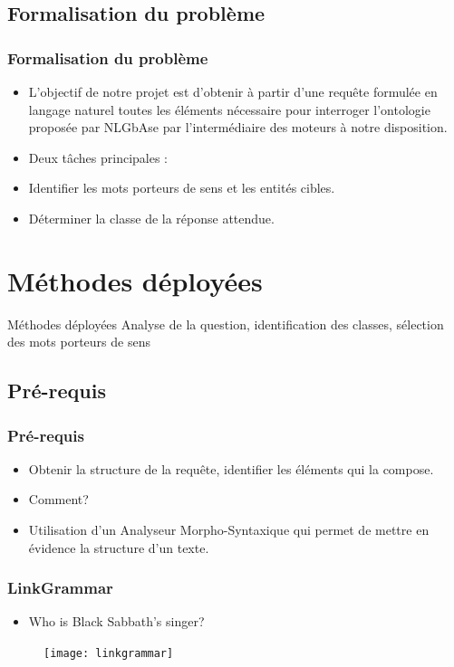 \documentclass[xcolor=dvipsnames]{beamer}
\begin{document}
\subsection{Formalisation du problème}
\frame 
{
    \frametitle{Formalisation du problème}
    \begin{itemize}
        \item<1-> L'objectif de notre projet est d'obtenir à partir d'une requête formulée en langage naturel toutes les éléments nécessaire pour interroger l'ontologie proposée par NLGbAse par l'intermédiaire des moteurs à notre disposition.
        \item<2-> Deux tâches principales :
        \item<3-> Identifier les mots porteurs de sens et les entités cibles.
        \item<4-> Déterminer la classe de la réponse attendue.
    \end{itemize}
}

\section{Méthodes déployées}
\begin{frame}
\begin{block}{\Large{Méthodes déployées}}
\tiny{Analyse de la question, identification des classes, sélection des mots porteurs de sens}
\end{block}
\end{frame}
\subsection{Pré-requis}
\frame
{
    \frametitle{Pré-requis}
    \begin{itemize}
        \item<1-> Obtenir la structure de la requête, identifier les éléments qui la compose.
        \item<2-> Comment?
        \item<3-> Utilisation d'un Analyseur Morpho-Syntaxique qui permet de mettre en évidence la structure d'un texte.
    \end{itemize}
}
\frame
{
    \frametitle{LinkGrammar}
    \begin{itemize}
        \item  Who is Black Sabbath's singer?
    \end{itemize}
    \begin{figure}
        \texttt{[image: linkgrammar]}
    \end{figure}
}
\end{document}
